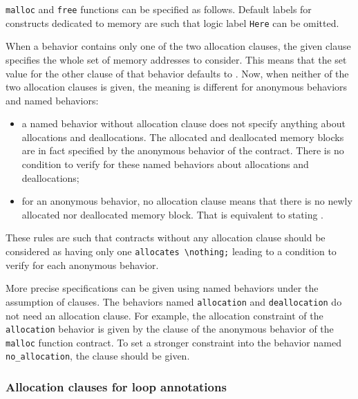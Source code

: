 \begin{example}
  \lstinline|malloc| and \lstinline|free| functions can be specified as follows.
  Default labels for constructs dedicated to memory are 
  such that logic label \lstinline|Here| can be omitted.
\end{example}

When a behavior contains only one of the two allocation clauses,
the given clause specifies the whole set of memory addresses to consider.
This means that the set value for the other clause of that behavior defaults to \nothing.
Now, when neither of the two allocation clauses is given, the meaning is different
for anonymous behaviors and named behaviors:
\begin{itemize}
\item a named behavior without allocation clause does not specify anything about
      allocations and deallocations. 
      The allocated and deallocated memory blocks are in fact specified by the 
      anonymous behavior of the contract.
      There is no condition to verify for these named behaviors about allocations 
      and deallocations;
\item for an anonymous behavior, no allocation clause means that there is no newly 
      allocated nor deallocated memory block. 
      That is equivalent to stating \allocates \nothing.
\end{itemize}
These rules are such that contracts without any allocation clause
should be considered 
as having only one \lstinline|allocates \nothing;| 
leading to a condition to verify for 
each anonymous behavior.

\begin{example}
  More precise specifications can be given using named behaviors under the 
  assumption of \assumes clauses.
  The behaviors named \lstinline|allocation| and
  \lstinline|deallocation| do not 
  need an allocation clause.
  For example, the allocation constraint of the \lstinline|allocation| behavior 
  is given by the clause \allocates \result of the anonymous behavior of the  
  \lstinline|malloc| function contract. 
  To set a stronger constraint into the behavior named \lstinline|no_allocation|,
  the clause \allocates \nothing should be given.
\end{example}

\subsubsection{Allocation clauses for loop annotations}

